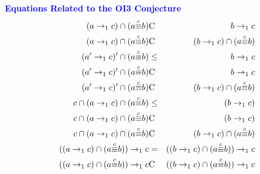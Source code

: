 \documentclass{slides}
\begin{document}
\begin{slide}

%
%
%
%
%
\textcolor{blue}{\textbf{Equations Related to the OI3 Conjecture}}
\begin{eqnarray}
(a\to_1 c)\cap (a{\buildrel c\over\equiv}b)  & {\rm C} &  b\to_1 c                  \label{eqa}\\
(a\to_1 c)\cap (a{\buildrel c\over\equiv}b)  & {\rm C} &  (b\to_1 c)\cap (a{\buildrel c\over\equiv}b)    \label{eqb}\\
(a'\to_1 c)'\cap (a{\buildrel c\over\equiv}b)  & \le &  b\to_1 c                    \label{eqc}\\
(a'\to_1 c)'\cap (a{\buildrel c\over\equiv}b)  & {\rm C} &  b\to_1 c                \label{eqd}\\
(a'\to_1 c)'\cap (a{\buildrel c\over\equiv}b)  & {\rm C} &  (b\to_1 c)\cap (a{\buildrel c\over\equiv}b)  \label{eqe}\\
c\cap (a\to_1 c)\cap (a{\buildrel c\over\equiv}b)  & \le &  (b\to_1 c)              \label{eqf}\\
c\cap (a\to_1 c)\cap (a{\buildrel c\over\equiv}b)  & {\rm C} &  (b\to_1 c)          \label{eqg}\\
c\cap (a\to_1 c)\cap (a{\buildrel c\over\equiv}b)  & {\rm C} &  (b\to_1 c)\cap (a{\buildrel c\over\equiv}b)     \label{eqh}\\
((a\to_1 c)\cap (a{\buildrel c\over\equiv}b))\to_1 c & = & ((b\to_1 c)\cap (a{\buildrel c\over\equiv}b))\to_1 c \label{eqi}\\
((a\to_1 c)\cap (a{\buildrel c\over\equiv}b))\to_1 c  & {\rm C} &  ((b\to_1 c)\cap (a{\buildrel c\over\equiv}b))\to_1 c
  \label{eqj}
\end{eqnarray}


\end{slide}
\end{document}
